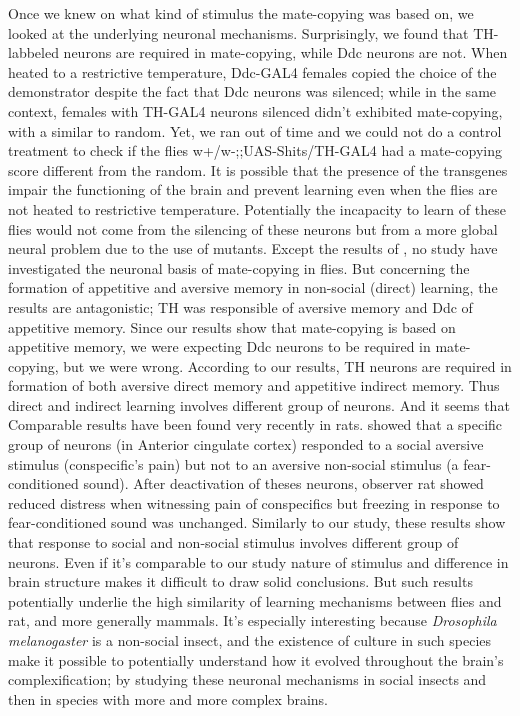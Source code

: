 \documentclass[a4paper, 12pt]{article}
\begin{document}
Once we knew on what kind of stimulus the mate-copying was based on, we looked at the underlying neuronal mechanisms. 
Surprisingly, we found that TH-labbeled neurons are required in mate-copying, while Ddc neurons are not. 
When heated to a restrictive temperature, Ddc-GAL4 females copied the choice of the demonstrator despite the fact that Ddc neurons was silenced; while in the same context, females with TH-GAL4 neurons silenced didn't exhibited mate-copying, with a similar to random. Yet, we ran out of time and we could not do a control treatment to check if the flies w+/w-;;UAS-Shits/TH-GAL4 had a mate-copying score different from the random. It is possible that the presence of the transgenes impair the functioning of the brain and prevent learning even when the flies are not heated to restrictive temperature. Potentially the incapacity to learn of these flies would not come from the silencing of these neurons but from a more global neural problem due to the use of mutants.
Except the results of \textcite{monier_dopamine_2018}, no study have investigated the neuronal basis of mate-copying in flies. But concerning the formation of appetitive and aversive memory in non-social (direct) learning, the results are antagonistic; TH was responsible of aversive memory and Ddc of appetitive memory. Since our results show that mate-copying is based on appetitive memory, we were expecting Ddc neurons to be required in mate-copying, but we were wrong.
According to our results, TH neurons are required in formation of both aversive direct memory and appetitive indirect memory. 
Thus direct and indirect learning involves different group of neurons. 
And it seems that
Comparable results have been found very recently in rats. \textcite{carrillo_emotional_2018} showed that a specific group of neurons (in Anterior cingulate cortex) responded to a social aversive stimulus (conspecific's pain) but not to an aversive non-social stimulus (a fear-conditioned sound). After deactivation of theses neurons, observer rat showed reduced distress when witnessing pain of conspecifics but freezing in response to fear-conditioned sound was unchanged.
Similarly to our study, these results show that response to social and non-social stimulus involves different group of neurons. Even if it's comparable to our study nature of stimulus and difference in brain structure makes it difficult to draw solid conclusions. But such results potentially underlie the high similarity of learning mechanisms between flies and rat, and more generally mammals. It's especially interesting because \textit{Drosophila melanogaster} is a non-social insect, and the existence of culture in such species make it possible to potentially understand how it evolved throughout the brain's complexification; by studying these neuronal mechanisms in social insects and then in species with more and more complex brains.
\end{document}
